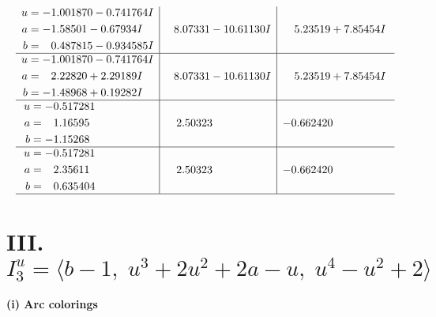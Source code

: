 \documentclass[1p]{elsarticle_modified}
\theoremstyle{definition}
\begin{document}
$$\begin{array}{c|c|c}
\begin{aligned}
u &= -1.001870 - 0.741764 I \\
a &= -1.58501 - 0.67934 I \\
b &= \phantom{-}0.487815 - 0.934585 I\end{aligned}
 & \phantom{-}8.07331 - 10.61130 I & \phantom{-}5.23519 + 7.85454 I \\ \hline\begin{aligned}
u &= -1.001870 - 0.741764 I \\
a &= \phantom{-}2.22820 + 2.29189 I \\
b &= -1.48968 + 0.19282 I\end{aligned}
 & \phantom{-}8.07331 - 10.61130 I & \phantom{-}5.23519 + 7.85454 I \\ \hline\begin{aligned}
u &= -0.517281\phantom{ +0.000000I} \\
a &= \phantom{-}1.16595\phantom{ +0.000000I} \\
b &= -1.15268\phantom{ +0.000000I}\end{aligned}
 & \phantom{-}2.50323\phantom{ +0.000000I} & -0.662420\phantom{ +0.000000I} \\ \hline\begin{aligned}
u &= -0.517281\phantom{ +0.000000I} \\
a &= \phantom{-}2.35611\phantom{ +0.000000I} \\
b &= \phantom{-}0.635404\phantom{ +0.000000I}\end{aligned}
 & \phantom{-}2.50323\phantom{ +0.000000I} & -0.662420\phantom{ +0.000000I}\\
 \hline 
 \end{array}$$\newpage\newpage\renewcommand{\arraystretch}{1}
\centering \section*{III. $I^u_{3}= \langle b-1,\;u^3+2 u^2+2 a- u,\;u^4- u^2+2 \rangle$}
\flushleft \textbf{(i) Arc colorings}\\
\end{document}
